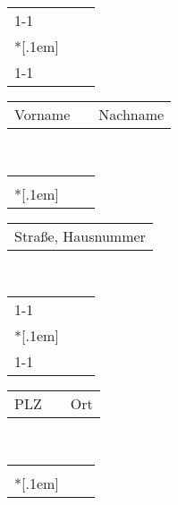 \documentclass[ngerman,a4wide]{scrartcl}
\begin{document}
\begin{Form}
	\noindent
\begin{tabular}{|p{}|l|p{}|}
\cline{1-1}
\cline{3-3}
&& \\*[.1em] 
\TextField[name=vname,height=.5em,width=.44\textwidth,%
bordercolor={0.65 0.79 0.94}]{}
& &
\TextField[name=name,height=.5em,width=.44\textwidth,%
bordercolor={0.65 0.79 0.94}]{}\\
\cline{1-1}
\cline{3-3}
\end{tabular}

\begin{tabular}{p{}lp{}}
Vorname & & Nachname\\
\end{tabular}\\

\begin{tabular}{|p{}ll|}
\hline
&& \\*[.1em] 
\TextField[name=street,height=.5em,width=.94\textwidth,%
bordercolor={0.65 0.79 0.94}]{}
& & \\
\hline
\end{tabular}

\begin{tabular}{p{}}
Straße, Hausnummer\\
\end{tabular}\\

\begin{tabular}{|p{}|l|p{}|}
\cline{1-1}
\cline{3-3}
&& \\*[.1em] 
\TextField[name=plz,height=.5em,width=.44\textwidth,%
bordercolor={0.65 0.79 0.94}]{}
& &
\TextField[name=ort,height=.5em,width=.44\textwidth,%
bordercolor={0.65 0.79 0.94}]{}\\
\cline{1-1}
\cline{3-3}
\end{tabular}

\begin{tabular}{p{}lp{}}
PLZ & & Ort\\
\end{tabular}\\

\begin{tabular}{|p{}ll|}
\hline
&& \\*[.1em] 
\TextField[name=email,height=.5em,width=0.94\textwidth,%
bordercolor={0.65 0.79 0.94}]{}
& & \\
\hline
\end{tabular}


\end{Form}
\end{document}
